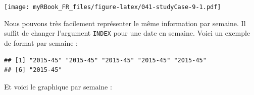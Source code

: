\documentclass[twoside,symmetric]{book}
\newenvironment{Shaded}{}{}
\newcommand{\DataTypeTok}[1]{\underline{#1}}
\newcommand{\KeywordTok}[1]{\textbf{#1}}
\newcommand{\NormalTok}[1]{#1}
\newcommand{\OperatorTok}[1]{#1}
\newcommand{\StringTok}[1]{#1}
\begin{document}
\texttt{[image: myRBook\_FR\_files/figure-latex/041-studyCase-9-1.pdf]}

Nous pouvons très facilement représenter le même information par semaine. Il suffit de changer l'argument \texttt{INDEX} pour une date en semaine. Voici un exemple de format par semaine :

\begin{Shaded}
\end{Shaded}

\begin{verbatim}
## [1] "2015-45" "2015-45" "2015-45" "2015-45" "2015-45"
## [6] "2015-45"
\end{verbatim}

Et voici le graphique par semaine :
\end{document}
